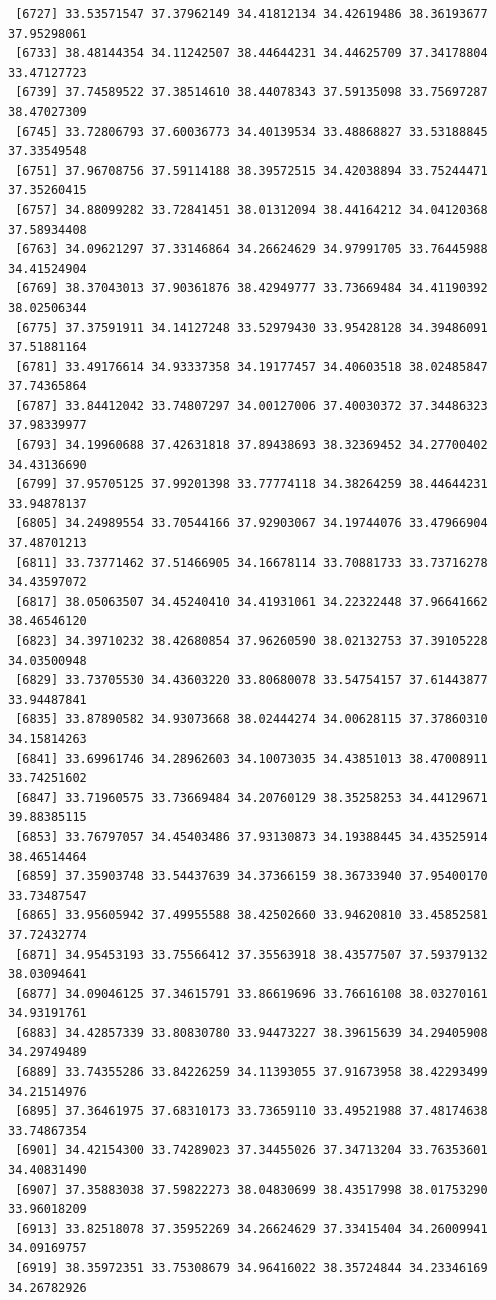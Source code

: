 \documentclass[
  letterpaper,
  DIV=11,
  numbers=noendperiod]{scrartcl}
\begin{document}
\begin{verbatim}
 [6727] 33.53571547 37.37962149 34.41812134 34.42619486 38.36193677 37.95298061
 [6733] 38.48144354 34.11242507 38.44644231 34.44625709 37.34178804 33.47127723
 [6739] 37.74589522 37.38514610 38.44078343 37.59135098 33.75697287 38.47027309
 [6745] 33.72806793 37.60036773 34.40139534 33.48868827 33.53188845 37.33549548
 [6751] 37.96708756 37.59114188 38.39572515 34.42038894 33.75244471 37.35260415
 [6757] 34.88099282 33.72841451 38.01312094 38.44164212 34.04120368 37.58934408
 [6763] 34.09621297 37.33146864 34.26624629 34.97991705 33.76445988 34.41524904
 [6769] 38.37043013 37.90361876 38.42949777 33.73669484 34.41190392 38.02506344
 [6775] 37.37591911 34.14127248 33.52979430 33.95428128 34.39486091 37.51881164
 [6781] 33.49176614 34.93337358 34.19177457 34.40603518 38.02485847 37.74365864
 [6787] 33.84412042 33.74807297 34.00127006 37.40030372 37.34486323 37.98339977
 [6793] 34.19960688 37.42631818 37.89438693 38.32369452 34.27700402 34.43136690
 [6799] 37.95705125 37.99201398 33.77774118 34.38264259 38.44644231 33.94878137
 [6805] 34.24989554 33.70544166 37.92903067 34.19744076 33.47966904 37.48701213
 [6811] 33.73771462 37.51466905 34.16678114 33.70881733 33.73716278 34.43597072
 [6817] 38.05063507 34.45240410 34.41931061 34.22322448 37.96641662 38.46546120
 [6823] 34.39710232 38.42680854 37.96260590 38.02132753 37.39105228 34.03500948
 [6829] 33.73705530 34.43603220 33.80680078 33.54754157 37.61443877 33.94487841
 [6835] 33.87890582 34.93073668 38.02444274 34.00628115 37.37860310 34.15814263
 [6841] 33.69961746 34.28962603 34.10073035 34.43851013 38.47008911 33.74251602
 [6847] 33.71960575 33.73669484 34.20760129 38.35258253 34.44129671 39.88385115
 [6853] 33.76797057 34.45403486 37.93130873 34.19388445 34.43525914 38.46514464
 [6859] 37.35903748 33.54437639 34.37366159 38.36733940 37.95400170 33.73487547
 [6865] 33.95605942 37.49955588 38.42502660 33.94620810 33.45852581 37.72432774
 [6871] 34.95453193 33.75566412 37.35563918 38.43577507 37.59379132 38.03094641
 [6877] 34.09046125 37.34615791 33.86619696 33.76616108 38.03270161 34.93191761
 [6883] 34.42857339 33.80830780 33.94473227 38.39615639 34.29405908 34.29749489
 [6889] 33.74355286 33.84226259 34.11393055 37.91673958 38.42293499 34.21514976
 [6895] 37.36461975 37.68310173 33.73659110 33.49521988 37.48174638 33.74867354
 [6901] 34.42154300 33.74289023 37.34455026 37.34713204 33.76353601 34.40831490
 [6907] 37.35883038 37.59822273 38.04830699 38.43517998 38.01753290 33.96018209
 [6913] 33.82518078 37.35952269 34.26624629 37.33415404 34.26009941 34.09169757
 [6919] 38.35972351 33.75308679 34.96416022 38.35724844 34.23346169 34.26782926

\end{verbatim}
\end{document}
